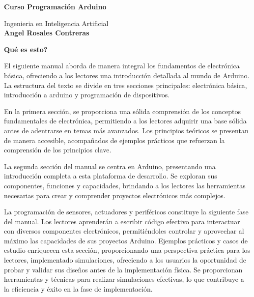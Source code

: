 \documentclass[a4paper,11pt]{report}    %
\begin{document}


\newpage
\thispagestyle{empty}
\begin{center}
	\Large
	\textbf{Curso Programación Arduino}
	
	\vspace{0.4cm}
	\large
	Ingenieria en Inteligencia Artificial\\

	\vspace{0.4cm}
	\textbf{Angel Rosales Contreras}

	\vspace{0.9cm}
	\textbf{Qué es esto?}
\end{center}


El siguiente manual aborda de manera integral los fundamentos de electrónica básica, ofreciendo a los lectores una introducción detallada al mundo de Arduino. La estructura del texto se divide en tres secciones principales: electrónica básica, introducción a arduino y programación de dispositivos.

En la primera sección, se proporciona una sólida comprensión de los conceptos fundamentales de electrónica, permitiendo a los lectores adquirir una base sólida antes de adentrarse en temas más avanzados. Los principios teóricos se presentan de manera accesible, acompañados de ejemplos prácticos que refuerzan la comprensión de los principios clave.

La segunda sección del manual se centra en Arduino, presentando una introducción completa a esta plataforma de desarrollo. Se exploran sus componentes, funciones y capacidades, brindando a los lectores las herramientas necesarias para crear y comprender proyectos electrónicos más complejos.

La programación de sensores, actuadores y periféricos constituye la siguiente fase del manual. Los lectores aprenderán a escribir código efectivo para interactuar con diversos componentes electrónicos, permitiéndoles controlar y aprovechar al máximo las capacidades de sus proyectos Arduino. Ejemplos prácticos y casos de estudio enriquecen esta sección, proporcionando una perspectiva práctica para los lectores, implementado  simulaciones, ofreciendo a los usuarios la oportunidad de probar y validar sus diseños antes de la implementación física. Se proporcionan herramientas y técnicas para realizar simulaciones efectivas, lo que contribuye a la eficiencia y éxito en la fase de implementación.
\end{document}

